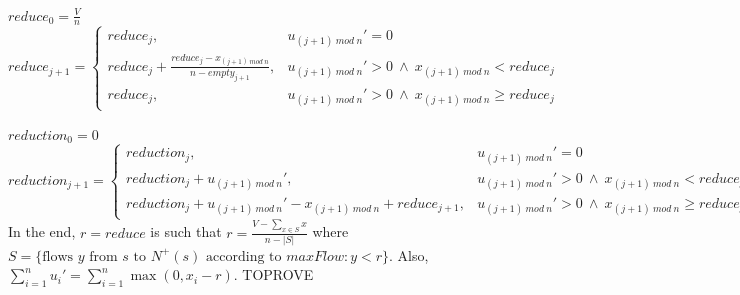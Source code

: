 \documentclass[11pt]{article}
\theoremstyle{definition}
\theoremstyle{corollary}
\theoremstyle{lemma}
\begin{document}
       $reduce_0 = \frac{V}{n}$ \\
       $reduce_{j+1} =
          \begin{cases}
             reduce_j, & u_{(j+1)\:mod\:n}' = 0 \\
             reduce_j + \frac{reduce_j-x_{(j+1)\:mod\:n}}{n-empty_{j+1}}, & u_{(j+1)\:mod\:n}' > 0 \: \wedge \:
                x_{(j+1) \:mod\:n} < reduce_j \\
             reduce_j, & u_{(j+1)\:mod\:n}' > 0 \: \wedge \: x_{(j+1) \:mod\:n} \geq reduce_j
          \end{cases}$ \\ \ \\
       $reduction_0 = 0$ \\
       $reduction_{j+1} =
          \begin{cases}
             reduction_j, & u_{(j+1)\:mod\:n}' = 0 \\
             reduction_j + u_{(j+1)\:mod\:n}', & u_{(j+1)\:mod\:n}' > 0 \: \wedge \: x_{(j+1) \:mod\:n} < reduce_j \\
             reduction_j + u_{(j+1)\:mod\:n}' - x_{(j+1)\:mod\:n} + reduce_{j+1}, &
                u_{(j+1)\:mod\:n}' > 0 \: \wedge \: x_{(j+1) \:mod\:n} \geq reduce_j
          \end{cases}$ \\
       In the end, $r = reduce$ is such that $r = \frac{V - \sum\limits_{x \in S}x}{n - |S|}$ where
       $S = \{\text{flows } y \text{ from } s \text{ to } N^{+}(s) \text{ according to } maxFlow : y < r\}$. Also,
       $\sum\limits_{i=1}^{n}u_i' = \sum\limits_{i=1}^{n}\max{(0,x_i - r)}$. TOPROVE
\end{document}
